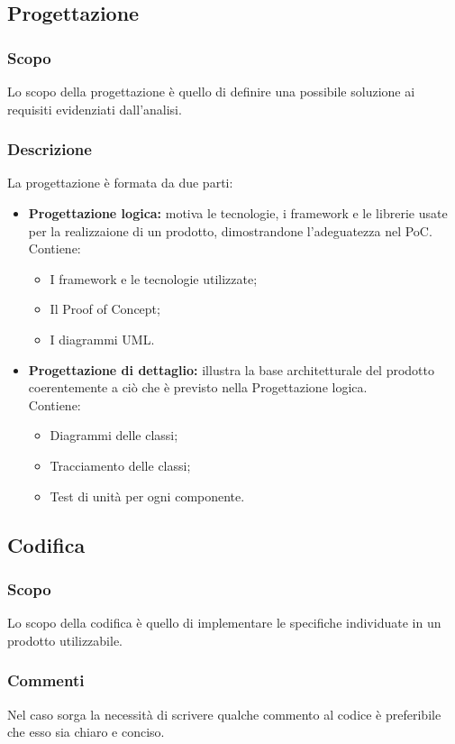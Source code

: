   \subsection{Progettazione}
  \subsubsection{Scopo}
  Lo scopo della progettazione è quello di definire una possibile soluzione ai requisiti evidenziati dall'analisi.
  \subsubsection{Descrizione}
  La progettazione è formata da due parti:
  \begin{itemize}
    \item \textbf{Progettazione logica:} motiva le tecnologie, i framework e le librerie usate per la realizzaione di un prodotto, dimostrandone l'adeguatezza nel PoC.
    \\Contiene:
    \begin{itemize}
      \item I framework e le tecnologie utilizzate;
      \item Il Proof of Concept;
      \item I diagrammi UML.
    \end{itemize}
    \item \textbf{Progettazione di dettaglio:} illustra la base architetturale del prodotto coerentemente a ciò che è previsto nella Progettazione logica.
    \\Contiene:
    \begin{itemize}
      \item Diagrammi delle classi;
      \item Tracciamento delle classi;
      \item Test di unità per ogni componente.
    \end{itemize}
  \end{itemize}
  
  \subsection{Codifica}
  \subsubsection{Scopo}
  Lo scopo della codifica è quello di implementare le specifiche individuate in un prodotto utilizzabile.
  \subsubsection{Commenti}
  Nel caso sorga la necessità di scrivere qualche commento al codice è preferibile che esso sia chiaro e conciso.
